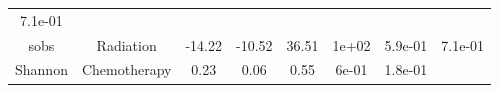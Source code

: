 \documentclass[12pt,]{article}
\begin{document}
\begin{longtable}[]{@{}cccccccc@{}}
\begin{minipage}[t]{0.08\columnwidth}
7.1e-01\strut
\end{minipage}\tabularnewline
\begin{minipage}[t]{0.12\columnwidth}\centering\strut
sobs\strut
\end{minipage} & \begin{minipage}[t]{0.11\columnwidth}\centering\strut
Radiation\strut
\end{minipage} & \begin{minipage}[t]{0.13\columnwidth}\centering\strut
-14.22\strut
\end{minipage} & \begin{minipage}[t]{0.08\columnwidth}\centering\strut
-10.52\strut
\end{minipage} & \begin{minipage}[t]{0.13\columnwidth}\centering\strut
36.51\strut
\end{minipage} & \begin{minipage}[t]{0.07\columnwidth}\centering\strut
1e+02\strut
\end{minipage} & \begin{minipage}[t]{0.06\columnwidth}\centering\strut
5.9e-01\strut
\end{minipage} & \begin{minipage}[t]{0.08\columnwidth}\centering\strut
7.1e-01\strut
\end{minipage}\tabularnewline
\begin{minipage}[t]{0.12\columnwidth}\centering\strut
Shannon\strut
\end{minipage} & \begin{minipage}[t]{0.11\columnwidth}\centering\strut
Chemotherapy\strut
\end{minipage} & \begin{minipage}[t]{0.13\columnwidth}\centering\strut
0.23\strut
\end{minipage} & \begin{minipage}[t]{0.08\columnwidth}\centering\strut
0.06\strut
\end{minipage} & \begin{minipage}[t]{0.13\columnwidth}\centering\strut
0.55\strut
\end{minipage} & \begin{minipage}[t]{0.07\columnwidth}\centering\strut
6e-01\strut
\end{minipage} & \begin{minipage}[t]{0.06\columnwidth}\centering\strut
1.8e-01\strut
\end{minipage} & \begin{minipage}[t]{0.08\columnwidth}\centering\strut

\end{minipage}
\end{longtable}
\end{document}
